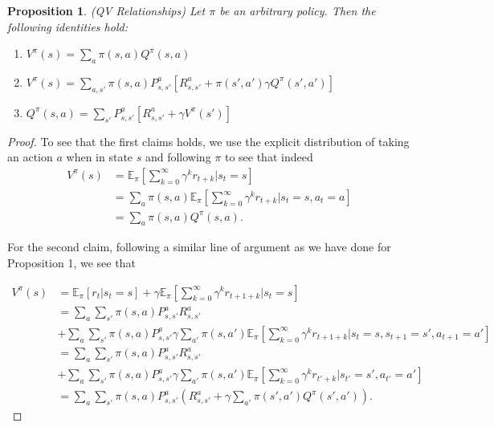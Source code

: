 \documentclass[11pt]{article} %
\newtheorem{prop}{Proposition}
\begin{document}
\begin{prop}{(QV Relationships)}
	Let $\pi$ be an arbitrary policy. Then the following identities hold:
	\begin{enumerate}
		\item $V^{\pi}(s) = \sum_a \pi(s,a) Q^{\pi}(s,a)$ \\
		\item $V^{\pi}(s) = \sum_{a,s'}  \pi(s,a) P_{s,s'}^a [ R_{s,s'}^a + \pi(s',a') \gamma Q^{\pi}(s',a')] $ \\
		\item $Q^{\pi}(s,a) = \sum_{s'} P_{s,s'}^a [ R_{s,s'}^a + \gamma V^{\pi}(s') ] $
	\end{enumerate}
\end{prop}

\begin{proof}
	To see that the first claims holds, we use the explicit distribution of taking an action $a$ when in state $s$ and following $\pi$ to see that indeed
	\[
		\begin{array}{rl}
			V^{\pi}(s)		& =  \mathbb{E}_{\pi}[\sum_{k=0}^{\infty} \gamma^k r_{t+k} | s_t = s] \\
						& =  \sum_a \pi(s,a) \mathbb{E}_{\pi}[\sum_{k=0}^{\infty} \gamma^k r_{t+k} | s_t = s, a_t = a] \\
						& = \sum_a \pi(s,a) Q^{\pi}(s,a).
		\end{array}
	\]

	For the second claim, following a similar line of argument as we have done for Proposition 1, we see that

	\[
		\begin{array}{rl}
			V^{\pi}(s)		& = \mathbb{E}_{\pi}[r_t | s_t = s] + \gamma \mathbb{E}_{\pi}[\sum_{k=0}^{\infty} \gamma^k r_{t+1+k} | s_t = s] \\
						& = \sum_a \sum_{s'} \pi(s,a) P_{s,s'}^a R_{s,s'}^a \\
						& + \sum_a \sum_{s'} \pi(s,a) P_{s,s'}^a \gamma  \sum_{a'} \pi(s,a') \mathbb{E}_{\pi}[\sum_{k=0}^{\infty} \gamma^k r_{t+1+k} | s_t = s, s_{t+1} = s', a_{t+1} = a'] \\
						& = \sum_a \sum_{s'} \pi(s,a) P_{s,s'}^a R_{s,s'}^a \\
						& + \sum_a \sum_{s'} \pi(s,a) P_{s,s'}^a \gamma  \sum_{a'} \pi(s,a') \mathbb{E}_{\pi}[\sum_{k=0}^{\infty} \gamma^k r_{t'+k} | s_{t'} = s', a_{t'} = a'] \\
						& =  \sum_a \sum_{s'} \pi(s,a) P_{s,s'}^a ( R_{s,s'}^a + \gamma \sum_{a'} \pi(s',a') Q^{\pi}(s',a') ).
		\end{array}
	\]


\end{proof}
\end{document}
